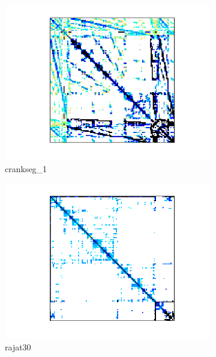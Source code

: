 \begin{figure}[H]
\begin{subfigure}[b]{0.3\textwidth}
        \includegraphics[width=\textwidth]{./images/CG/crankseg_1.png}
        \caption{crankseg\_1}
    \end{subfigure}
    \quad 
    \begin{subfigure}[b]{0.3\textwidth}
        \includegraphics[width=\textwidth]{./images/CG/rajat30.png}
        \caption{rajat30}
    \end{subfigure}
    \quad 
    \begin{subfigure}[b]{0.3\textwidth}

\end{subfigure}
\end{figure}
